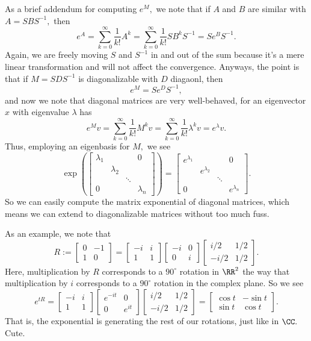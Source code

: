 As a brief addendum for computing $e^M,$ we note that if $A$ and $B$ are similar with $A=SBS^{-1},$ then
\[e^A=\sum_{k=0}^\infty\frac1{k!}A^k=\sum_{k=0}^\infty\frac1{k!}SB^kS^{-1}=Se^BS^{-1}.\]
Again, we are freely moving $S$ and $S^{-1}$ in and out of the sum because it's a mere linear transformation and will not affect the convergence. Anyways, the point is that if $M=SDS^{-1}$ is diagonalizable with $D$ diagaonl, then
\[e^M=Se^DS^{-1},\]
and now we note that diagonal matrices are very well-behaved, for an eigenvector $x$ with eigenvalue $\lambda$ has
\[e^Mv=\sum_{k=0}^\infty\frac1{k!}M^kv=\sum_{k=0}^\infty\frac1{k!}\lambda^kv=e^\lambda v.\]
Thus, employing an eigenbasis for $M,$ we see
\[\exp\left(\begin{bmatrix}
    \lambda_1 & & & 0 \\
    & \lambda_2 \\
    & & \ddots \\
    0 & & & \lambda_n
\end{bmatrix}\right)=\begin{bmatrix}
    e^{\lambda_1} & & & 0 \\
    & e^{\lambda_2} \\
    & & \ddots \\
    0 & & & e^{\lambda_n}
\end{bmatrix}.\]
So we can easily compute the matrix exponential of diagonal matrices, which means we can extend to diagonalizable matrices without too much fuss.

As an example, we note that
\[R:=\begin{bmatrix}
    0 & -1 \\ 1 & 0
\end{bmatrix}=\begin{bmatrix}
    -i & i \\ 1 & 1
\end{bmatrix}\begin{bmatrix}
    -i & 0 \\ 0 & i
\end{bmatrix}\begin{bmatrix}
    i/2 & 1/2 \\ -i/2 & 1/2
\end{bmatrix}.\]
Here, multiplication by $R$ corresponds to a $90^\circ$ rotation in $\RR^2$ the way that multiplication by $i$ corresponds to a $90^\circ$ rotation in the complex plane. So we see
\[e^{tR}=\begin{bmatrix}
    -i & i \\ 1 & 1
\end{bmatrix}\begin{bmatrix}
    e^{-it} & 0 \\ 0 & e^{it}
\end{bmatrix}\begin{bmatrix}
    i/2 & 1/2 \\ -i/2 & 1/2
\end{bmatrix}=\begin{bmatrix}
    \cos t & -\sin t \\
    \sin t & \cos t
\end{bmatrix}.\]
That is, the exponential is generating the rest of our rotations, just like in $\CC.$ Cute.

